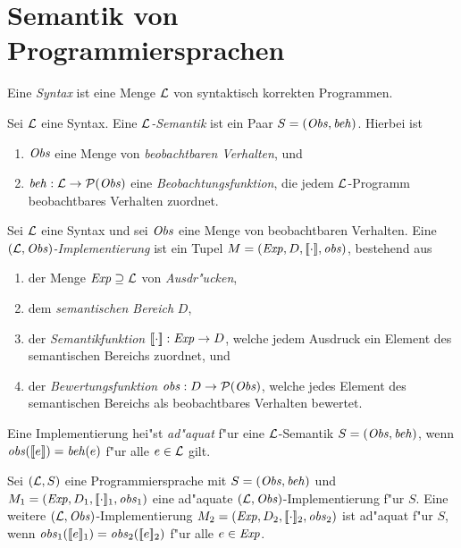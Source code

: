 \documentclass[12pt,a4paper]{article}
\begin{document}
\section{Semantik von Programmiersprachen}

\begin{definition}[Syntax]
  Eine \emph{Syntax} ist eine Menge $\mathcal L$ von syntaktisch korrekten Programmen.
\end{definition}

\begin{definition}[Semantik]
  Sei $\mathcal L$ eine Syntax. Eine \emph{$\mathcal L$-Semantik} ist ein Paar $S = (\mathit{Obs},\mathit{beh})$.
  Hierbei ist
  \begin{enumerate}
  \item $\mathit{Obs}$ eine Menge von \emph{beobachtbaren Verhalten}, und
  \item $\mathit{beh}: \mathcal L \to \mathcal{P}(\mathit{Obs})$ eine \emph{Beobachtungsfunktion}, die jedem $\mathcal L$-Programm
    beobachtbares Verhalten zuordnet.
  \end{enumerate}
\end{definition}

\begin{definition}[Implementierung]
  Sei $\mathcal L$ eine Syntax und sei $\mathit{Obs}$ eine Menge von beobachtbaren Verhalten.
  Eine \emph{$(\mathcal L,\mathit{Obs})$-Implementierung} ist ein Tupel $M = (\mathit{Exp},D,[\![\cdot]\!],\mathit{obs})$,
  bestehend aus
  \begin{enumerate}
  \item der Menge $\mathit{Exp} \supseteq \mathcal L$ von \emph{Ausdr"ucken},
  \item dem \emph{semantischen Bereich} $D$,
  \item der \emph{Semantikfunktion} $[\![\cdot]\!]:\mathit{Exp} \to D$, welche jedem Ausdruck
    ein Element des semantischen Bereichs zuordnet, und
  \item der \emph{Bewertungsfunktion} $\mathit{obs}:D \to \mathcal{P}(\mathit{Obs})$, welche jedes Element
    des semantischen Bereichs als beobachtbares Verhalten bewertet.
  \end{enumerate}
  Eine Implementierung hei"st \emph{ad"aquat} f"ur eine $\mathcal L$-Semantik $S=(\mathit{Obs},\mathit{beh})$,
  wenn $\mathit{obs}([\![e]\!]) = \mathit{beh}(e)$ f"ur alle $e \in \mathcal L$ gilt.
\end{definition}

\begin{lemma} \label{lemma1}
  Sei $(\mathcal L,S)$ eine Programmiersprache mit $S = (\mathit{Obs},\mathit{beh})$ und $M_1 = (\mathit{Exp},D_1,[\![\cdot]\!]_1,\mathit{obs}_1)$
  eine ad"aquate $(\mathcal L,\mathit{Obs})$-Implementierung f"ur $S$.
  Eine weitere $(\mathcal L,\mathit{Obs})$-Implementierung $M_2=(\mathit{Exp},D_2,[\![\cdot]\!]_2,\mathit{obs}_2)$
  ist ad"aquat f"ur $S$, wenn $\mathit{obs}_1([\![e]\!]_1) = \mathit{obs}_2([\![e]\!]_2)$ f"ur alle $e \in \mathit{Exp}$.
\end{lemma}
\end{document}
